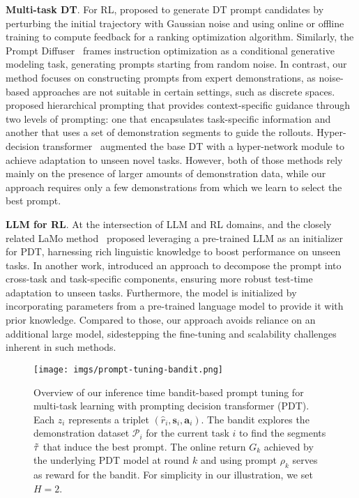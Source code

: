 \textbf{Multi-task DT}. For RL, \citet{hu2023prompt} proposed to generate DT prompt candidates by perturbing the initial trajectory with Gaussian noise and using online or offline training to compute feedback for a ranking optimization algorithm. Similarly, the Prompt Diffuser~\citep{hu2024prompt} frames instruction optimization as a conditional generative modeling task, generating prompts starting from random noise. In contrast, our method focuses on constructing prompts from expert demonstrations, as noise-based approaches are not suitable in certain settings, such as discrete spaces. \citet{wang2024hierarchical} proposed hierarchical prompting that provides context-specific guidance through two levels of prompting: one that encapsulates task-specific information and another that uses a set of demonstration segments to guide the rollouts. Hyper-decision transformer~\citep{xu2023hyper} augmented the base DT with a hyper-network module to achieve adaptation to unseen novel tasks. However, both of those methods rely mainly on the presence of larger amounts of demonstration data, while our approach requires only a few demonstrations from which we learn to select the best prompt.

\textbf{LLM for RL}. At the intersection of LLM and RL domains, \citet{yang2024pre} and the closely related LaMo method~\citep{shi2024unleashing} proposed leveraging a pre-trained LLM as an initializer for PDT, harnessing rich linguistic knowledge to boost performance on unseen tasks. In another work, \citet{zhengdecomposed} introduced an approach to decompose the prompt into cross-task and task-specific components, ensuring more robust test-time adaptation to unseen tasks. Furthermore, the model is initialized by incorporating parameters from a pre-trained language model to provide it with prior knowledge. Compared to those, our approach avoids reliance on an additional large model, sidestepping the fine-tuning and scalability challenges inherent in such methods.

\begin{figure*}[tbp]
    \centering
    \texttt{[image: imgs/prompt-tuning-bandit.png]}
    \caption{Overview of our inference time bandit-based prompt tuning for multi-task learning with prompting decision transformer (PDT). Each $z_i$ represents a triplet $(\hat{r}_i, \mathbf{s}_i, \mathbf{a}_i)$. The bandit explores the demonstration dataset $\mathcal{P}_i$ for the current task $i$ to find the segments $\Tilde{\tau}$ that induce the best prompt. The online return $G_k$ achieved by the underlying PDT model at round $k$ and using prompt $\rho_k$ serves as reward for the bandit. For simplicity in our illustration, we set $H=2$.}
    \label{fig:prompt_dt_bandit}
\end{figure*}